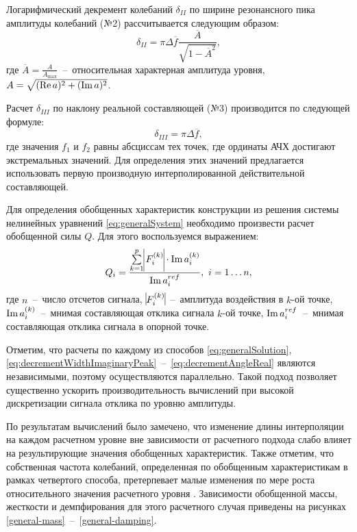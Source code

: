 Логарифмический декремент колебаний $ \delta_{II} $ по ширине резонансного
пика амплитуды колебаний (№2) рассчитывается следующим образом:
\begin{equation}
	\delta_{II} = \pi \Delta \overline{f} \frac{\overline{A}}{\sqrt{1 - \overline{A} ^ 2}}, \label{eq:decrementWidthAmplitudePeak}
\end{equation}
где $ \overline{A} = \frac{A}{A_{\max}}$~--~относительная характерная амплитуда уровня, $ A = \sqrt{(\operatorname{Re} a) ^ 2 + (\operatorname{Im} a) ^ 2} $.

Расчет  $ \delta_{III} $ по наклону реальной составляющей (№3) производится по следующей формуле:
\begin{equation}
	\delta_{III} = \pi \Delta \overline{f},
	\label{eq:decrementAngleReal}
\end{equation}
где значения $f_1$ и $f_2$ равны абсциссам тех точек, где ординаты АЧХ достигают экстремальных значений. Для определения этих значений предлагается использовать первую производную интерполированной действительной составляющей.

Для определения обобщенных характеристик конструкции из решения системы нелинейных уравнений \eqref{eq:generalSystem} необходимо произвести расчет обобщенной силы $Q$. Для этого воспользуемся выражением:
\begin{equation}
	Q_i = \frac{\sum\limits_{k=1}^p \vline F_i ^ {(k)} \vline \cdot \imag a_i ^ {(k)}}{\imag a_i ^ {ref}}, \ i = 1 \dots n,
\end{equation}
где $n$~--~число отсчетов сигнала, $ \vline F_i ^ {(k)} \vline $~--~амплитуда воздействия в $k$-ой точке, $\operatorname{Im} a_i ^ {(k)}$~--~мнимая составляющая отклика сигнала $k$-ой точке, $ \operatorname{Im} a_i ^ {ref} $~--~мнимая составляющая отклика сигнала в опорной точке.

Отметим, что расчеты по каждому из способов \eqref{eq:generalSolution}, \eqref{eq:decrementWidthImaginaryPeak}~--~\eqref{eq:decrementAngleReal} являются независимыми, поэтому осуществляются параллельно. Такой подход позволяет существенно ускорить производительность вычислений при высокой дискретизации сигнала отклика по уровню амплитуды.

По результатам вычислений было замечено, что изменение длины интерполяции на каждом расчетном уровне вне зависимости от расчетного подхода слабо влияет на результирующие значения обобщенных характеристик.
Также отметим, что собственная частота колебаний, определенная по обобщенным характеристикам в рамках четвертого способа, претерпевает малые изменения по мере роста относительного значения расчетного уровня . Зависимости обобщенной массы, жесткости и демпфирования для этого расчетного случая приведены на рисунках \ref{general-mass}~--~\ref{general-damping}.

